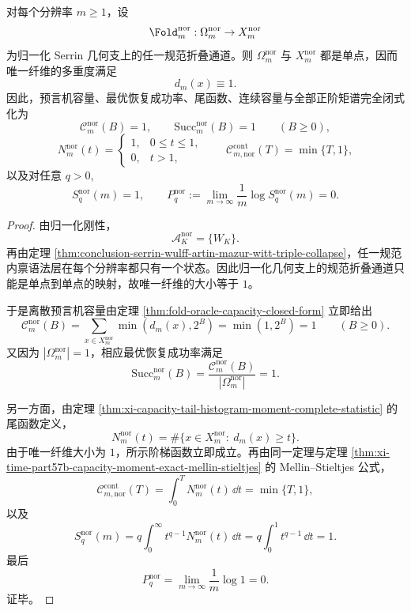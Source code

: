 \begin{theorem}\label{thm:conclusion-serrin-wulff-oracle-tail-mellin-trivial-profile}
对每个分辨率 \(m\ge 1\)，设
\[
\Fold_m^{\mathrm{nor}}:\Omega_m^{\mathrm{nor}}\to X_m^{\mathrm{nor}}
\]
为归一化 Serrin 几何支上的任一规范折叠通道。则 \(\Omega_m^{\mathrm{nor}}\) 与 \(X_m^{\mathrm{nor}}\) 都是单点，因而唯一纤维的多重度满足
\[
d_m(x)\equiv 1.
\]
因此，预言机容量、最优恢复成功率、尾函数、连续容量与全部正阶矩谱完全闭式化为
\[
\mathcal C_m^{\mathrm{nor}}(B)=1,
\qquad
\mathrm{Succ}_m^{\mathrm{nor}}(B)=1
\qquad(B\ge 0),
\]
\[
N_m^{\mathrm{nor}}(t)=
\begin{cases}
1,& 0\le t\le 1,\\
0,& t>1,
\end{cases}
\qquad
\mathcal C_{m,\mathrm{nor}}^{\mathrm{cont}}(T)=\min\{T,1\},
\]
以及对任意 \(q>0\),
\[
S_q^{\mathrm{nor}}(m)=1,
\qquad
P_q^{\mathrm{nor}}:=\lim_{m\to\infty}\frac1m\log S_q^{\mathrm{nor}}(m)=0.
\]
\end{theorem}
\begin{proof}
由归一化刚性，
\[
\mathcal A_K^{\mathrm{nor}}=\{W_K\}.
\]
再由定理 \ref{thm:conclusion-serrin-wulff-artin-mazur-witt-triple-collapse}，任一规范内禀语法层在每个分辨率都只有一个状态。因此归一化几何支上的规范折叠通道只能是单点到单点的映射，故唯一纤维的大小等于 \(1\)。

于是离散预言机容量由定理 \ref{thm:fold-oracle-capacity-closed-form} 立即给出
\[
\mathcal C_m^{\mathrm{nor}}(B)
=
\sum_{x\in X_m^{\mathrm{nor}}}\min(d_m(x),2^B)
=
\min(1,2^B)=1
\qquad(B\ge 0).
\]
又因为 \(|\Omega_m^{\mathrm{nor}}|=1\)，相应最优恢复成功率满足
\[
\mathrm{Succ}_m^{\mathrm{nor}}(B)
=
\frac{\mathcal C_m^{\mathrm{nor}}(B)}{|\Omega_m^{\mathrm{nor}}|}
=1.
\]

另一方面，由定理 \ref{thm:xi-capacity-tail-histogram-moment-complete-statistic} 的尾函数定义，
\[
N_m^{\mathrm{nor}}(t)
=
\#\{x\in X_m^{\mathrm{nor}}:\ d_m(x)\ge t\}.
\]
由于唯一纤维大小为 \(1\)，所示阶梯函数立即成立。再由同一定理与定理 \ref{thm:xi-time-part57b-capacity-moment-exact-mellin-stieltjes} 的 Mellin--Stieltjes 公式，
\[
\mathcal C_{m,\mathrm{nor}}^{\mathrm{cont}}(T)
=
\int_0^T N_m^{\mathrm{nor}}(t)\,\dd t
=
\min\{T,1\},
\]
以及
\[
S_q^{\mathrm{nor}}(m)
=
q\int_0^\infty t^{q-1}N_m^{\mathrm{nor}}(t)\,\dd t
=
q\int_0^1 t^{q-1}\,\dd t
=
1.
\]
最后
\[
P_q^{\mathrm{nor}}
=
\lim_{m\to\infty}\frac1m\log 1
=
0.
\]
证毕。
\end{proof}

